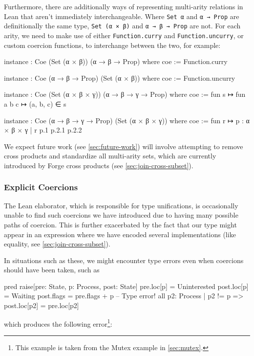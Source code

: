 Furthermore, there are additionally ways of representing multi-arity relations in Lean that aren't immediately interchangeable. Where \texttt{Set α} and \texttt{α → Prop} are definitionally the same type, \texttt{Set (α × β)} and \texttt{α → β → Prop} are not. For each arity, we need to make use of either \texttt{Function.curry} and \texttt{Function.uncurry}, or custom coercion functions, to interchange between the two, for example: 
\begin{leanimpl*}
instance : Coe (Set (α × β)) (α → β → Prop) where
  coe := Function.curry

instance : Coe (α → β → Prop) (Set (α × β)) where
  coe := Function.uncurry

instance : Coe (Set (α × β × γ)) (α → β → γ → Prop) where
  coe := fun s ↦ fun a b c ↦ (a, b, c) ∈ s

instance : Coe (α → β → γ → Prop) (Set (α × β × γ)) where
  coe := fun r ↦ {p : α × β × γ | r p.1 p.2.1 p.2.2}
\end{leanimpl*}
We expect future work (see \cref{sec:future-work}) will involve attempting to remove cross products and standardize all multi-arity sets, which are currently introduced by Forge cross products (see \cref{sec:join-cross-subset}). 

\subsubsection{Explicit Coercions}

The Lean elaborator, which is responsible for type unifications, is occasionally unable to find such coercions we have introduced due to having many possible paths of coercion. This is further exacerbated by the fact that our type might appear in an expression where we have encoded several implementations (like equality, see \cref{sec:join-cross-subset}). 

In situations such as these, we might encounter type errors even when coercions should have been taken, such as 
\begin{forge*}
pred raise[pre: State, p: Process, post: State] {
  pre.loc[p] = Uninterested
  post.loc[p] = Waiting
  post.flags = pre.flags + p -- Type error!
  all p2: Process | p2 != p => post.loc[p2] = pre.loc[p2]
}
\end{forge*}
\newpage
\noindent which produces the following error\footnote{This example is taken from the Mutex example in \cref{sec:mutex}.}:

\begin{center}
\end{center}


